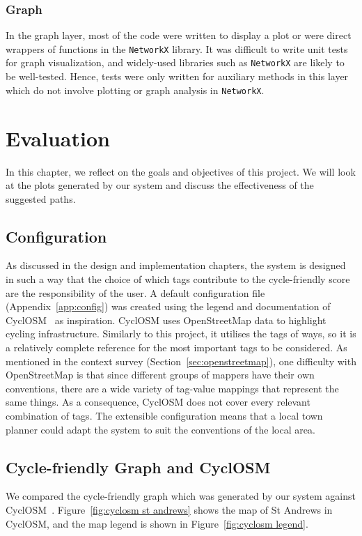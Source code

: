 \documentclass[12pt,a4paper]{report}
\begin{document}
\subsection{Graph}
In the graph layer, most of the code were written to display a plot or were direct wrappers of functions in the \texttt{NetworkX} library. It was difficult to write unit tests for graph visualization, and widely-used libraries such as \texttt{NetworkX} are likely to be well-tested. Hence, tests were only written for auxiliary methods in this layer which do not involve plotting or graph analysis in \texttt{NetworkX}.

\chapter{Evaluation}\label{chapter:eval}
In this chapter, we reflect on the goals and objectives of this project. We will look at the plots generated by our system and discuss the effectiveness of the suggested paths.

\section{Configuration}
As discussed in the design and implementation chapters, the system is designed in such a way that the choice of which tags contribute to the cycle-friendly score are the responsibility of the user. A default configuration file (Appendix~\ref{app:config}) was created using the legend and documentation of CyclOSM~\cite{cycleOSM} as inspiration. CyclOSM uses OpenStreetMap data to highlight cycling infrastructure. Similarly to this project, it utilises the tags of ways, so it is a relatively complete reference for the most important tags to be considered. As mentioned in the context survey (Section~\ref{sec:openstreetmap}), one difficulty with OpenStreetMap is that since different groups of mappers have their own conventions, there are a wide variety of tag-value mappings that represent the same things. As a consequence, CyclOSM does not cover every relevant combination of tags. The extensible configuration means that a local town planner could adapt the system to suit the conventions of the local area.

\section{Cycle-friendly Graph and CyclOSM}\label{sec:eval_osm}
We compared the cycle-friendly graph which was generated by our system against CyclOSM~\cite{cycleOSM}. Figure~\ref{fig:cyclosm st andrews} shows the map of St Andrews in CyclOSM, and the map legend is shown in Figure~\ref{fig:cyclosm legend}.
\end{document}
